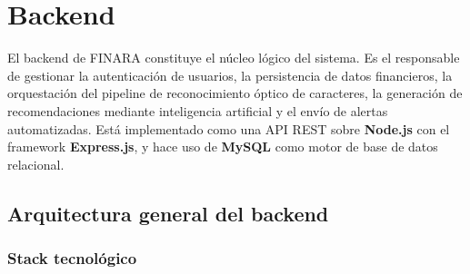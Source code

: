 \section{Backend}

El backend de FINARA constituye el núcleo lógico del sistema. Es el
responsable de gestionar la autenticación de usuarios, la persistencia
de datos financieros, la orquestación del pipeline de reconocimiento
óptico de caracteres, la generación de recomendaciones mediante
inteligencia artificial y el envío de alertas automatizadas. Está
implementado como una API REST sobre \textbf{Node.js} con el framework
\textbf{Express.js}, y hace uso de \textbf{MySQL} como motor de base de
datos relacional.

\subsection{Arquitectura general del backend}

\subsubsection{Stack tecnológico}

